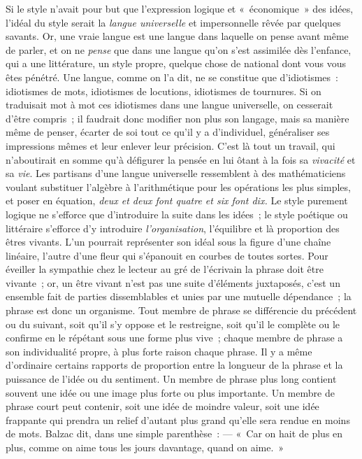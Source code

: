 \documentclass[french,twoside]{book} %
\begin{document}
Si le style n’avait pour but que l’expression logique et « économique » des idées, l’idéal du style serait la \emph{langue universelle} et impersonnelle rêvée par quelques savants. Or, une vraie langue est une langue dans laquelle on pense avant même de parler, et on ne \emph{pense} que dans une langue qu’on s’est assimilée dès l’enfance, qui a une littérature, un style propre, quelque chose de national dont vous vous êtes pénétré. Une langue, comme on l’a dit, ne se constitue que d’idiotismes : idiotismes de mots, idiotismes de locutions, idiotismes de tournures. Si on traduisait mot à mot ces idiotismes dans une langue universelle, on cesserait d’être compris ; il faudrait donc modifier non plus son langage, mais sa manière même de penser, écarter de soi tout ce qu’il y a d’individuel, généraliser ses impressions mêmes et leur enlever leur précision. C’est là tout un travail, qui n’aboutirait en somme qu’à défigurer la pensée en lui ôtant à la fois sa \emph{vivacité} et sa \emph{vie}. Les partisans d’une langue universelle ressemblent à des mathématiciens voulant substituer l’algèbre à l’arithmétique pour les opérations les plus simples, et poser en équation, \emph{deux et deux font quatre et six font dix.} Le style purement logique ne s’efforce que d’introduire la suite dans les idées ; le style poétique ou littéraire s’efforce d’y introduire \emph{l’organisation}, l’équilibre et là proportion des êtres vivants. L’un pourrait représenter son idéal sous la figure d’une chaîne linéaire, l’autre d’une fleur qui s’épanouit en courbes de toutes sortes. Pour éveiller la sympathie chez le lecteur au gré de l’écrivain la phrase doit être vivante ; or, un être vivant n’est pas une suite d’éléments juxtaposés, c’est un ensemble fait de parties dissemblables et unies par une mutuelle dépendance ; la phrase est donc un organisme. Tout membre de phrase se différencie du précédent ou du suivant, soit qu’il s’y oppose et le restreigne, soit qu’il le complète ou le confirme en le répétant sous une forme plus vive ; chaque membre de phrase a son individualité propre, à plus forte raison chaque phrase. Il y a même d’ordinaire certains rapports de proportion entre la longueur de la phrase et la puissance de l’idée ou du sentiment. Un membre de phrase plus long contient souvent une idée ou une image plus forte ou plus importante. Un membre de phrase court peut contenir, soit une idée de moindre valeur, soit une idée frappante qui prendra un relief d’autant plus grand qu’elle sera rendue en moins de mots. Balzac dit, dans une simple parenthèse : — « Car on hait de plus en plus, comme on aime tous les jours davantage, quand on aime. »\par
\end{document}
